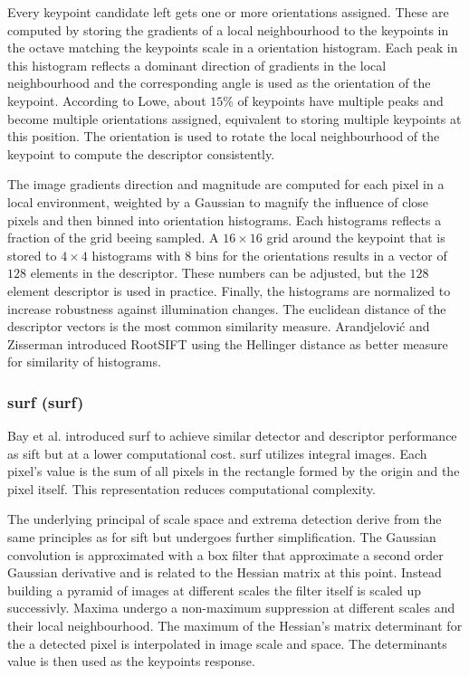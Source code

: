 Every keypoint candidate left gets one or more orientations assigned.
These are computed by storing the gradients of a local neighbourhood to the keypoints in the octave matching the keypoints scale in a orientation histogram.
Each peak in this histogram reflects a dominant direction of gradients in the local neighbourhood and the corresponding angle is used as the orientation of the keypoint.
According to Lowe, about $15\%$ of keypoints have multiple peaks and become multiple orientations assigned, equivalent to storing multiple keypoints at this position.
The orientation is used to rotate the local neighbourhood of the keypoint to compute the descriptor consistently.

The image gradients direction and magnitude are computed for each pixel in a local environment, weighted by a Gaussian to magnify the influence of close pixels and then binned into orientation histograms.
Each histograms reflects a fraction of the grid beeing sampled.
A $16 \times 16$ grid around the keypoint that is stored to $4 \times 4$ histograms with $8$ bins for the orientations results in a vector of $128$ elements in the descriptor.
These numbers can be adjusted, but the $128$ element descriptor is used in practice.
Finally, the histograms are normalized to increase robustness against illumination changes.
The euclidean distance of the descriptor vectors is the most common similarity measure.
Arandjelović and Zisserman\cite{arandjelovic_2012} introduced RootSIFT using the Hellinger distance\cite{hellinger_1909} as better measure for similarity of histograms.

\subsubsection{\acrshort{surf} (\acrlong{surf})}

Bay et al. introduced \acrshort{surf}\cite{bay_eccv06} to achieve similar detector and descriptor performance as \acrshort{sift} but at a lower computational cost.
\acrshort{surf} utilizes integral images\cite{viola_cvpr01}.
Each pixel's value is the sum of all pixels in the rectangle formed by the origin and the pixel itself.
This representation reduces computational complexity.

The underlying principal of scale space and extrema detection derive from the same principles as for \acrshort{sift} but undergoes further simplification.
The Gaussian convolution is approximated with a box filter that approximate a second order Gaussian derivative and is related to the Hessian matrix at this point.
Instead building a pyramid of images at different scales the filter itself is scaled up successivly.
Maxima undergo a non-maximum suppression at different scales and their local neighbourhood.
The maximum of the Hessian's matrix determinant for the a detected pixel is interpolated in image scale and space.
The determinants value is then used as the keypoints response.

